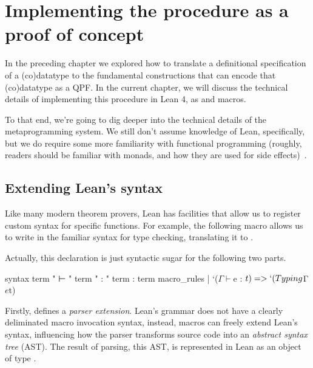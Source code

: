 




\chapter{Implementing the procedure as a proof of concept}%
\label{ch:implementing}


In the preceding chapter we explored how to translate a definitional specification of a (co)datatype to the fundamental constructions that can encode that (co)datatype as a QPF.
In the current chapter, we will discuss the technical details of implementing this procedure in Lean 4, as \data{}
and \codata{} macros.

To that end, we're going to dig deeper into the technical details of the metaprogramming system.
We still don't assume knowledge of Lean, specifically, but we do require some more familiarity with functional programming (roughly, readers should be familiar with monads, and how they are used for side effects)~\cite{ullrichNotationsHygienicMacro2022,paulinoMetaprogrammingLean}.


\section{Extending Lean's syntax}%
\label{sec:syntax}

Like many modern theorem provers, Lean has facilities that allow us to register custom syntax for specific functions. For example, the following macro allows us to write  in the familiar syntax for type checking, translating it to .
Actually, this  declaration is just syntactic sugar for the following two parts.

\begin{leancode}
  syntax term " ⊢ " term " : " term : term
  macro_rules
    | `($Γ ⊢ $e : $t) => `(Typing $Γ $e $t)
\end{leancode}

Firstly,  defines a \emph{parser extension}.
Lean's grammar does not have a clearly deliminated macro invocation syntax, instead,
macros can freely extend Lean's syntax, influencing how the parser transforms source code into an \emph{abstract syntax tree} (AST).
The result of parsing, this AST, is represented in Lean as an object of type .

